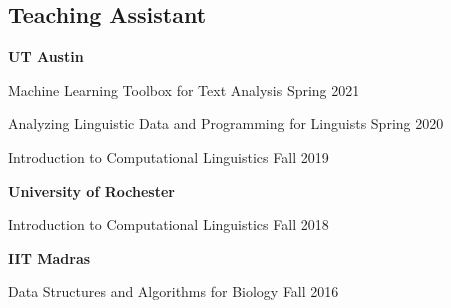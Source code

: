 \subsection{Teaching Assistant}

\textbf{\small UT Austin}

\quad Machine Learning Toolbox for Text Analysis \hfill Spring 2021

\quad Analyzing Linguistic Data and Programming for Linguists \hfill Spring 2020

\quad Introduction to Computational Linguistics \hfill Fall 2019

\textbf{\small University of Rochester}

\quad Introduction to Computational Linguistics \hfill Fall 2018

\textbf{\small IIT Madras}

\quad Data Structures and Algorithms for Biology \hfill Fall 2016

